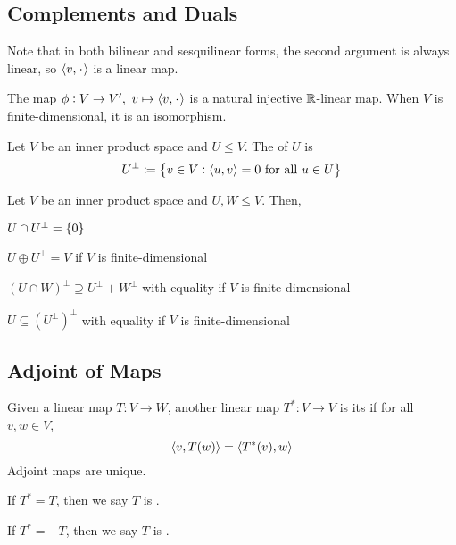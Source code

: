 \documentclass{styles/tufte}
\begin{document}
\subsection{Complements and Duals}
  
  Note that in both bilinear and sesquilinear forms, the second argument is always linear, so $\abrak{v, \funcarg}$ is a linear map.
  
  \begin{theorem}{}{}
    The map $\phi: V \to V',\ v \mapsto \abrak{v, \funcarg}$ is a natural injective $\mathbb{R}$-linear map. When $V$ is finite-dimensional, it is an isomorphism.
  \end{theorem}
  
  \begin{definition}{}{}
    Let $V$ be an inner product space and $U \leqslant V$. The  of $U$ is
    \[ U^\bot \coloneqq \set{v \in V: \langle u, v \rangle = 0 \text{ for all $u \in U$}} \]
  \end{definition}
  
  \begin{proposition}{}{}
    Let $V$ be an inner product space and $U, W \leqslant V$. Then,
    \begin{romanenum}
      \item $U \cap U^\bot = \set{0}$
      \item $U \oplus U^\bot = V$ if $V$ is finite-dimensional
      \item $(U \cap W)^\bot \supseteq U^\bot + W^\bot$ with equality if $V$ is finite-dimensional
      \item $U \subseteq (U^\bot)^\bot$ with equality if $V$ is finite-dimensional
    \end{romanenum}
  \end{proposition}
  
  \begin{proposition}{}{}
    
  \end{proposition}


\subsection{Adjoint of Maps}
  
  \begin{definition}{}{}
    Given a linear map $T: V \to W$, another linear map $T^*: V \to V$ is its  if for all $v, w \in V$,
    \[ \langle v, T(w) \rangle = \langle T^*(v), w \rangle \]
    Adjoint maps are unique.
    
    If $T^* = T$, then we say $T$ is .
    
    If $T^* = -T$, then we say $T$ is .
  \end{definition}
  
\end{document}
